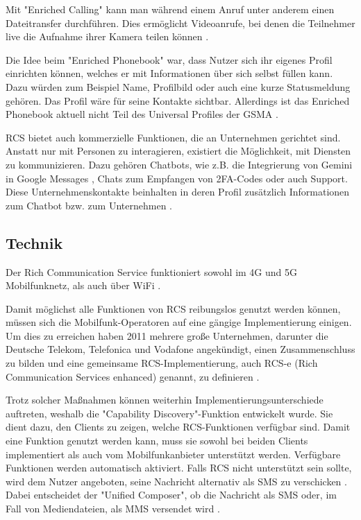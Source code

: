 \documentclass[conference]{IEEEtran}
\begin{document}
Mit "Enriched Calling" kann man während einem Anruf unter anderem einen Dateitransfer durchführen.
Dies ermöglicht Videoanrufe, bei denen die Teilnehmer live die Aufnahme ihrer Kamera teilen können \cite{uniprof}.

Die Idee beim "Enriched Phonebook" war, dass Nutzer sich ihr eigenes Profil einrichten können, welches er mit Informationen über sich selbst füllen kann.
Dazu würden zum Beispiel Name, Profilbild oder auch eine kurze Statusmeldung gehören.
Das Profil wäre für seine Kontakte sichtbar.
Allerdings ist das Enriched Phonebook aktuell nicht Teil des Universal Profiles der GSMA \cite{rcsuite,uniprof}.

RCS bietet auch kommerzielle Funktionen, die an Unternehmen gerichtet sind.
Anstatt nur mit Personen zu interagieren, existiert die Möglichkeit, mit Diensten zu kommunizieren. Dazu gehören Chatbots, wie z.B. die Integrierung von Gemini in Google Messages \cite{geminiinteg}, Chats zum Empfangen von 2FA-Codes oder auch Support. Diese Unternehmenskontakte beinhalten in deren Profil zusätzlich Informationen zum Chatbot bzw. zum Unternehmen \cite{uniprof}.


\subsection{Technik}

Der Rich Communication Service funktioniert sowohl im 4G und 5G Mobilfunknetz, als auch über WiFi \cite{5gmsg}.

Damit möglichst alle Funktionen von RCS reibungslos genutzt werden können, müssen sich die Mobilfunk-Operatoren auf eine gängige Implementierung einigen.
Um dies zu erreichen haben 2011 mehrere große Unternehmen, darunter die Deutsche Telekom, Telefonica und Vodafone angekündigt, einen Zusammenschluss zu bilden und eine gemeinsame RCS-Implementierung, auch RCS-e (Rich Communication Services enhanced) genannt, zu definieren \cite{rcsmno}.

Trotz solcher Maßnahmen können weiterhin Implementierungsunterschiede auftreten, weshalb die "Capability Discovery"-Funktion entwickelt wurde.
Sie dient dazu, den Clients zu zeigen, welche RCS-Funktionen verfügbar sind.
Damit eine Funktion genutzt werden kann, muss sie sowohl bei beiden Clients implementiert als auch vom Mobilfunkanbieter unterstützt werden.
Verfügbare Funktionen werden automatisch aktiviert.
Falls RCS nicht unterstützt sein sollte, wird dem Nutzer angeboten, seine Nachricht alternativ als SMS zu verschicken \cite{uniprof}.
Dabei entscheidet der "Unified Composer", ob die Nachricht als SMS oder, im Fall von Mediendateien, als MMS versendet wird \cite{rcsuite}.
\end{document}
